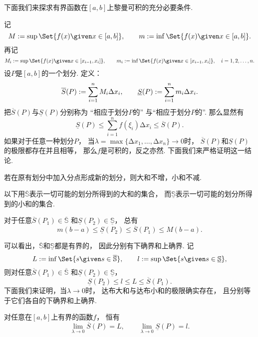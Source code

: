 下面我们来探求有界函数在\([a,b]\)上黎曼可积的充分必要条件.

记\[
	M \defeq \sup\Set{ f(x) \given x\in[a,b] }, \qquad
	m \defeq \inf\Set{ f(x) \given x\in[a,b] }.
\]
再记\[
	M_i \defeq \sup\Set{ f(x) \given x\in[x_{i-1},x_i] }, \qquad
	m_i \defeq \inf\Set{ f(x) \given x\in[x_{i-1},x_i] },
	\quad i=1,2,\dotsc,n.
\]
设\(P\)是\([a,b]\)的一个划分.
定义：\[
	\overline{S}(P) := \sum_{i=1}^n M_i \Delta x_i, \qquad
	\underline{S}(P) := \sum_{i=1}^n m_i \Delta x_i.
\]
把\(\overline{S}(P)\)与\(\underline{S}(P)\)分别称为
“相应于划分\(P\)的”
与“相应于划分\(P\)的”.
那么显然有\[
	\underline{S}(P)
	\leq \sum_{i=1}^n f(\xi_i) \increment x_i
	\leq \overline{S}(P).
\]
如果对于任意一种划分\(P\)，
当\(\lambda = \max\{\increment x_1,\dotsc,\increment x_n\} \to 0\)时，
\(\overline{S}(P)\)和\(\underline{S}(P)\)的极限都存在并且相等，
那么\(f\)是可积的，反之亦然.
下面我们来严格证明这一结论.

\begin{lemma}
若在原有划分中加入分点形成新的划分，则大和不增，小和不减.
\end{lemma}

以下用\(\overline{\mathbb{S}}\)表示一切可能的划分所得到的大和的集合，
而\(\underline{\mathbb{S}}\)表示一切可能的划分所得到的小和的集合.
\begin{lemma}
对于任意\(\overline{S}(P_1) \in \overline{\mathbb{S}}\)
和\(\underline{S}(P_2) \in \underline{\mathbb{S}}\)，
总有\[
	m(b-a)
	\leq \underline{S}(P_2)
	\leq \overline{S}(P_1)
	\leq M(b-a).
\]
\end{lemma}
可以看出，\(\overline{\mathbb{S}}\)和\(\underline{\mathbb{S}}\)都是有界的，
因此分别有下确界和上确界.
记\[
	L \defeq \inf\Set{ s \given s \in \overline{\mathbb{S}} }, \qquad
	l \defeq \sup\Set{ s \given s \in \underline{\mathbb{S}} },
\]
则对任意\(\overline{S}(P_1) \in \overline{\mathbb{S}}\)
和\(\underline{S}(P_2) \in \underline{\mathbb{S}}\)，\[
	\underline{S}(P_2)
	\leq l \leq L
	\leq \overline{S}(P_1).
\]
下面我们来证明，当\(\lambda\to0\)时，
达布大和与达布小和的极限确实存在，
且分别等于它们各自的下确界和上确界.
\begin{lemma}
对任意在\([a,b]\)上有界的函数\(f\)，
恒有\[
	\lim_{\lambda\to0} \overline{S}(P) = L, \qquad
	\lim_{\lambda\to0} \underline{S}(P) = l.
\]
\end{lemma}


